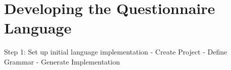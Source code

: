 \section{Developing the Questionnaire Language}

Step 1: Set up initial language implementation
- Create Project
- Define Grammar
- Generate Implementation

